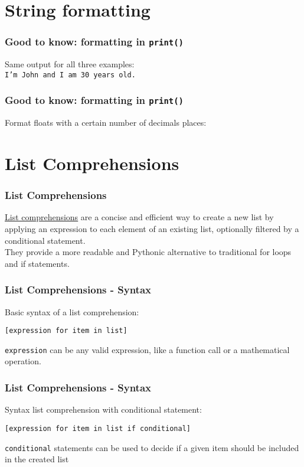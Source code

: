 \documentclass{beamer}
\newcommand{\hrefu}[2]{\underline{\href{#1}{#2}}}
\begin{document}
\section{String formatting}
\begin{frame}
  \frametitle{Good to know: formatting in \texttt{print()}}
  
  Same output for all three examples: \\
  \texttt{I'm John and I am 30 years old.}
\end{frame}
\begin{frame}
  \frametitle{Good to know: formatting in \texttt{print()}}
  Format floats with a certain number of decimals places: 
  
\end{frame}
\section{List Comprehensions}
\begin{frame}
  \frametitle{List Comprehensions}
  \hrefu{https://www.w3schools.com/python/python_lists_comprehension.asp}{List comprehensions} are a concise and efficient way to create a new list by applying an expression to each element of an existing list, optionally filtered by a conditional statement. \\They provide a more readable and Pythonic alternative to traditional for loops and if statements.\\
\end{frame}
\begin{frame}
  \frametitle{List Comprehensions - Syntax}
  Basic syntax of a list comprehension: \\
  \begin{center}
    \vspace{5mm}
    \texttt{[expression for item in list]} \\
  \end{center}
  \texttt{expression} can be any valid expression, like a function call or a mathematical operation.\\
  
\end{frame}
\begin{frame}
  \frametitle{List Comprehensions - Syntax}
  Syntax list comprehension with conditional statement: \\
  \begin{center}
    \vspace{5mm}
    \texttt{[expression for item in list if conditional]} \\
  \end{center}
  \texttt{conditional} statements can be used to decide if a given item should be included in the created list \\
  
\end{frame}
\end{document}
